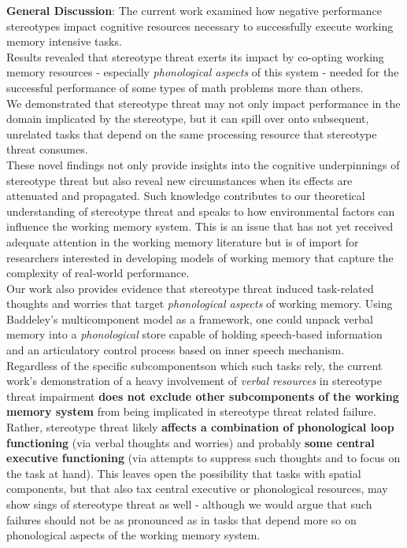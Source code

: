 \documentclass[
  doc, a4paper]{apa7}
\begin{document}
\textbf{General Discussion}:
The current work examined how negative performance stereotypes impact cognitive resources necessary to successfully execute working memory intensive tasks.\\
Results revealed that stereotype threat exerts its impact by co-opting working memory resources - especially \emph{phonological aspects} of this system - needed for the successful performance of some types of math problems more than others.\\
We demonstrated that stereotype threat may not only impact performance in the domain implicated by the stereotype, but it can spill over onto subsequent, unrelated tasks that depend on the same processing resource that stereotype threat consumes.\\
These novel findings not only provide insights into the cognitive underpinnings of stereotype threat but also reveal new circumstances when its effects are attenuated and propagated. Such knowledge contributes to our theoretical understanding of stereotype threat and speaks to how environmental factors can influence the working memory system. This is an issue that has not yet received adequate attention in the working memory literature but is of import for researchers interested in developing models of working memory that capture the complexity of real-world performance.\\
Our work also provides evidence that stereotype threat induced task-related thoughts and worries that target \emph{phonological aspects} of working memory. Using Baddeley's multicomponent model as a framework, one could unpack verbal memory into a \emph{phonological} store capable of holding speech-based information and an articulatory control process based on inner speech mechanism.\\
Regardless of the specific subcomponentson which such tasks rely, the current work's demonstration of a heavy involvement of \emph{verbal resources} in stereotype threat impairment \textbf{does not exclude other subcomponents of the working memory system} from being implicated in stereotype threat related failure. Rather, stereotype threat likely \textbf{affects a combination of phonological loop functioning} (via verbal thoughts and worries) and probably \textbf{some central executive functioning} (via attempts to suppress such thoughts and to focus on the task at hand). This leaves open the possibility that tasks with spatial components, but that also tax central executive or phonological resources, may show sings of stereotype threat as well - although we would argue that such failures should not be as pronounced as in tasks that depend more so on phonological aspects of the working memory system.\\
\end{document}
